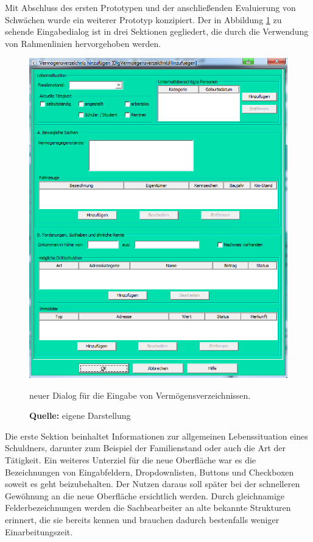 Mit Abschluss des ersten Prototypen und der anschließenden Evaluierung von Schwächen wurde ein weiterer Prototyp konzipiert. Der in Abbildung \ref{fig:neuerDialog} zu sehende Eingabedialog ist in drei Sektionen gegliedert, die durch die Verwendung von Rahmenlinien hervorgehoben werden. 
\begin{figure}[H]
  \centering
  \includegraphics[scale=0.88]{img/neuer_Dialog.PNG}
  \caption{neuer Dialog für die Eingabe von Vermögensverzeichnissen.}
    \caption*{\textbf{Quelle:} eigene Darstellung}
  \label{fig:neuerDialog}
\end{figure}
Die erste Sektion beinhaltet Informationen zur allgemeinen Lebenssituation eines Schuldners, darunter zum Beispiel der Familienstand oder auch die Art der Tätigkeit. Ein weiteres Unterziel für die neue Oberfläche war es die Bezeichnungen von Eingabfeldern, Dropdownlisten, Buttons und Checkboxen soweit es geht beizubehalten. Der Nutzen daraus soll später bei der schnelleren Gewöhnung an die neue Oberfläche ersichtlich werden. Durch gleichnamige Felderbezeichnungen werden die Sachbearbeiter an alte bekannte Strukturen erinnert, die sie bereits kennen und brauchen dadurch bestenfalls weniger Einarbeitungszeit.

